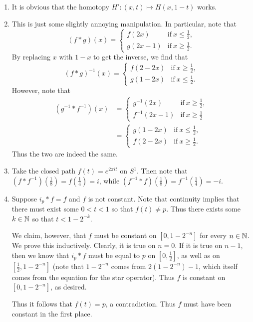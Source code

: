 \documentclass[../../solutions.tex]{subfiles}
\begin{document}
\begin{exercise} \leavevmode
\begin{enumerate}
\item It is obvious that the homotopy $H':(x,t)\mapsto H(x,1-t)$ works. 

\item This is just some slightly annoying manipulation. In particular, note that \[(f*g)(x)=\begin{cases}f(2x)&\text{if}~x\le\frac12,\\g(2x-1)&\text{if}~x\ge\frac12.\end{cases}\] By replacing $x$ with $1-x$ to get the inverse, we find that \[(f*g)^{-1}(x)=\begin{cases}f(2-2x)&\text{if}~x\ge\frac12,\\g(1-2x)&\text{if}~x\le\frac12.\end{cases}\] However, note that \begin{align*}(g^{-1}*f^{-1})(x)&=\begin{cases}g^{-1}(2x)&\text{if}~x\ge\frac12,\\f^{-1}(2x-1)&\text{if}~x\ge\frac12\end{cases}\\&=\begin{cases}g(1-2x)&\text{if}~x\le\frac12,\\f(2-2x)&\text{if}~x\ge\frac12.\end{cases}\end{align*} Thus the two are indeed the same. 

\item Take the closed path $f(t)=e^{2\pi it}$ on $S^1$. Then note that $(f*f^{-1})(\frac18)=f(\frac14)=i$, while $(f^{-1}*f)(\frac18)=f^{-1}(\frac14)=-i$. 

\item Suppose $i_p*f=f$ and $f$ is not constant. Note that continuity implies that there must exist some $0<t<1$ so that $f(t)\ne p$. Thus there exists some $k\in\mathbb{N}$ so that $t<1-2^{-k}$. 

We claim, however, that $f$ must be constant on $[0,1-2^{-n}]$ for every $n\in\mathbb{N}$. We prove this inductively. Clearly, it is true on $n=0$. If it is true on $n-1$, then we know that $i_p*f$ must be equal to $p$ on $[0,\frac12]$, as well as on $[\frac12,1-2^{-n}]$ (note that $1-2^{-n}$ comes from $2(1-2^{-n})-1$, which itself comes from the equation for the star operator). Thus $f$ is constant on $[0,1-2^{-n}]$, as desired. 

Thus it follows that $f(t)=p$, a contradiction. Thus $f$ must have been constant in the first place. 
\end{enumerate} 
\end{exercise} 
\end{document}
